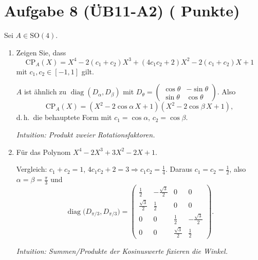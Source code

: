 \documentclass[11pt, a4paper]{article}
\newcommand{\aufgabe}[2]{%
  \section*{\Large\bfseries Aufgabe #1%
  \if\relax\detokenize{#2}\relax\else \hfill\normalfont\normalsize(#2 Punkte)\fi}%
  \vspace{-1.5ex}
}
\begin{document}
\aufgabe{8 (ÜB11-A2)}{}
Sei $A\in \mathrm{SO}(4)$.
\begin{enumerate}
  \item Zeigen Sie, dass
  \[
    \mathrm{CP}_A(X)=X^4-2(c_1+c_2)X^3+(4c_1c_2+2)X^2-2(c_1+c_2)X+1
  \]
  mit $c_1,c_2\in[-1,1]$ gilt.
  \begin{framed}
  $A$ ist ähnlich zu $\operatorname{diag}(D_\alpha,D_\beta)$ mit
  $D_\theta=\begin{pmatrix}\cos\theta&-\sin\theta\\ \sin\theta&\cos\theta\end{pmatrix}$.
  Also
  \[
  \mathrm{CP}_A(X)=(X^2-2\cos\alpha\,X+1)(X^2-2\cos\beta\,X+1),
  \]
  d.\,h.\ die behauptete Form mit $c_1=\cos\alpha$, $c_2=\cos\beta$.

  \medskip\noindent\textit{Intuition: Produkt zweier Rotationsfaktoren.}
  \end{framed}

  \item Für das Polynom $X^4-2X^3+3X^2-2X+1$.
  \begin{framed}
  Vergleich: $c_1+c_2=1$, $4c_1c_2+2=3\Rightarrow c_1c_2=\tfrac14$.
  Daraus $c_1=c_2=\tfrac12$, also $\alpha=\beta=\tfrac\pi3$ und
  \[
  \operatorname{diag}\!\big(D_{\pi/3},D_{\pi/3}\big)
  =
  \begin{pmatrix}
  \tfrac12&-\tfrac{\sqrt3}{2}&0&0\\
  \tfrac{\sqrt3}{2}&\tfrac12&0&0\\
  0&0&\tfrac12&-\tfrac{\sqrt3}{2}\\
  0&0&\tfrac{\sqrt3}{2}&\tfrac12
  \end{pmatrix}.
  \]

  \medskip\noindent\textit{Intuition: Summen/Produkte der Kosinuswerte fixieren die Winkel.}
  \end{framed}
\end{enumerate}
\end{document}
